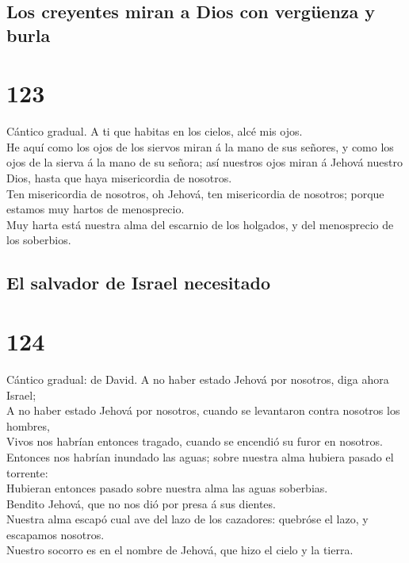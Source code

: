 \hypertarget{los-creyentes-miran-a-dios-con-verguxfcenza-y-burla}{%
\subsection{Los creyentes miran a Dios con vergüenza y
burla}\label{los-creyentes-miran-a-dios-con-verguxfcenza-y-burla}}

\hypertarget{section-19-123}{%
\section{123}\label{section-19-123}}

 Cántico gradual. A ti que habitas en los cielos, alcé mis
ojos.\\
 He aquí como los ojos de los siervos miran á la mano de
sus señores, y como los ojos de la sierva á la mano de su señora; así
nuestros ojos miran á Jehová nuestro Dios, hasta que haya misericordia
de nosotros.\\
 Ten misericordia de nosotros, oh Jehová, ten misericordia
de nosotros; porque estamos muy hartos de menosprecio.\\
 Muy harta está nuestra alma del escarnio de los holgados,
y del menosprecio de los soberbios.

\hypertarget{el-salvador-de-israel-necesitado}{%
\subsection{El salvador de Israel
necesitado}\label{el-salvador-de-israel-necesitado}}

\hypertarget{section-19-124}{%
\section{124}\label{section-19-124}}

 Cántico gradual: de David. A no haber estado Jehová por
nosotros, diga ahora Israel;\\
 A no haber estado Jehová por nosotros, cuando se
levantaron contra nosotros los hombres,\\
 Vivos nos habrían entonces tragado, cuando se encendió su
furor en nosotros.\\
 Entonces nos habrían inundado las aguas; sobre nuestra
alma hubiera pasado el torrente:\\
 Hubieran entonces pasado sobre nuestra alma las aguas
soberbias.\\
 Bendito Jehová, que no nos dió por presa á sus dientes.\\
 Nuestra alma escapó cual ave del lazo de los cazadores:
quebróse el lazo, y escapamos nosotros.\\
 Nuestro socorro es en el nombre de Jehová, que hizo el
cielo y la tierra.

